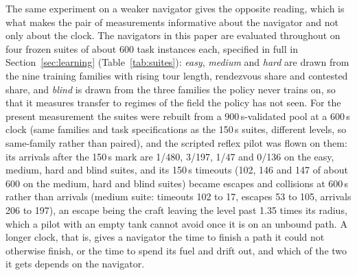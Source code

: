 \documentclass[11pt]{article}
\begin{document}
The same experiment on a weaker navigator gives the opposite reading, which
is what makes the pair of measurements informative about the navigator and
not only about the clock. The navigators in this paper are evaluated
throughout on four frozen suites of about 600 task instances each, specified
in full in Section~\ref{sec:learning} (Table~\ref{tab:suites}): \emph{easy},
\emph{medium} and \emph{hard} are drawn from the nine training families
with rising tour length, rendezvous share and contested share, and
\emph{blind} is drawn from the three families the policy never trains on, so
that it measures transfer to regimes of the field the policy has not seen.
For the present measurement the suites were rebuilt from a
900\,s-validated pool at a 600\,s clock (same families and task
specifications as the 150\,s suites, different levels, so same-family rather
than paired), and the scripted reflex pilot was flown on them: its arrivals
after the 150\,s mark are 1/480, 3/197, 1/47 and 0/136 on the easy, medium,
hard and blind suites, and its 150\,s timeouts (102, 146 and 147 of about
600 on the medium, hard and blind suites) became escapes and collisions at
600\,s rather than arrivals (medium suite: timeouts 102 to 17, escapes 53 to
105, arrivals 206 to 197), an escape being the craft leaving the level past
1.35 times its radius, which a pilot with an empty tank cannot avoid once it
is on an unbound path. A longer clock, that is, gives a navigator the time to
finish a path it could not otherwise finish, or the time to spend its fuel
and drift out, and which of the two it gets depends on the navigator.
\end{document}
